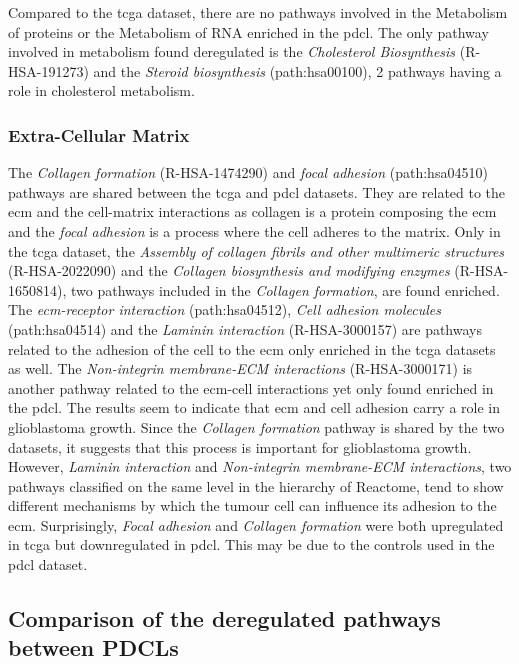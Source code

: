 Compared to the \acrshort{tcga} dataset, there are no pathways involved in the Metabolism of proteins or the Metabolism of RNA enriched in the \acrshort{pdcl}.
The only pathway involved in metabolism found deregulated is the \textit{Cholesterol Biosynthesis} (R-HSA-191273) and the \textit{Steroid biosynthesis} (path:hsa00100), 2 pathways having a role in cholesterol metabolism.

\subsubsection{Extra-Cellular Matrix}

The \textit{Collagen formation} (R-HSA-1474290) and \textit{focal adhesion} (path:hsa04510) pathways are shared between the \acrshort{tcga} and \acrshort{pdcl} datasets.
They are related to the \acrlong{ecm} and the cell-matrix interactions as collagen is a protein composing the \acrshort{ecm} and the \textit{focal adhesion} is a process where the cell adheres to the matrix.
Only in the \acrshort{tcga} dataset, the \textit{Assembly of collagen fibrils and other multimeric structures} (R-HSA-2022090) and the \textit{Collagen biosynthesis and modifying enzymes} (R-HSA-1650814), two pathways included in the \textit{Collagen formation}, are found enriched.
The \textit{\acrshort{ecm}-receptor interaction} (path:hsa04512), \textit{Cell adhesion molecules} (path:hsa04514) and the \textit{Laminin interaction} (R-HSA-3000157) are pathways related to the adhesion of the cell to the \acrshort{ecm} only enriched in the \acrshort{tcga} datasets as well.
The \textit{Non-integrin membrane-ECM interactions} (R-HSA-3000171) is another pathway related to the \acrshort{ecm}-cell interactions yet only found enriched in the \acrshort{pdcl}.
The results seem to indicate that \acrshort{ecm} and cell adhesion carry a role in glioblastoma growth.
Since the \textit{Collagen formation} pathway is shared by the two datasets, it suggests that this process is important for glioblastoma growth.
However, \textit{Laminin interaction} and \textit{Non-integrin membrane-ECM interactions}, two pathways classified on the same level in the hierarchy of Reactome, tend to show different mechanisms by which the tumour cell can influence its adhesion to the \acrshort{ecm}.
Surprisingly, \textit{Focal adhesion} and \textit{Collagen formation} were both upregulated in \acrshort{tcga} but downregulated in \acrshort{pdcl}.
This may be due to the controls used in the \acrshort{pdcl} dataset.

\subsection{Comparison of the deregulated pathways between PDCLs}

